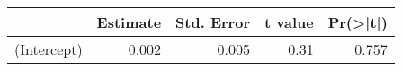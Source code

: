 
\begin{tabular}{l|r|r|r|r}
\hline
  & Estimate & Std. Error & t value & Pr(>|t|)\\
\hline
(Intercept) & 0.002 & 0.005 & 0.31 & 0.757\\
\hline
\end{tabular}
